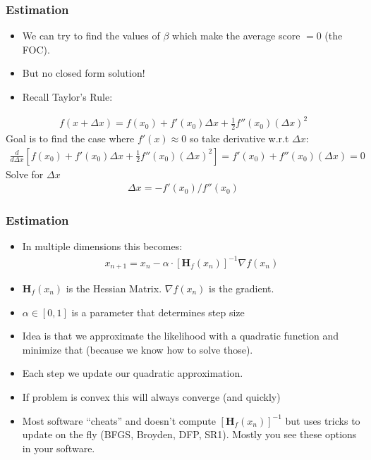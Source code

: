 \documentclass[aspectratio=169]{beamer}
\begin{document}
\begin{frame}
\frametitle{Estimation}
\begin{itemize} 
\item We can try to find the values of $\beta$ which make the average score $=0$ (the FOC).
\item But no closed form solution!
\item Recall Taylor's Rule:
\end{itemize}
\begin{eqnarray*}
f(x + \Delta x) =  f(x_0) + f'(x_0) \Delta x + \frac{1}{2} f''(x_0) (\Delta x)^2
\end{eqnarray*}
Goal is to find the case where $f'(x) \approx 0$ so take derivative w.r.t $\Delta x$:
\begin{eqnarray*}
\frac{d}{d \Delta x} \left[  f(x_0) + f'(x_0) \Delta x + \frac{1}{2} f''(x_0) (\Delta x)^2 \right] = f'(x_0) +  f''(x_0) (\Delta x) = 0
\end{eqnarray*}
Solve for $\Delta x$
\begin{eqnarray*}
\Delta x  = - f'(x_0) / f''(x_0)
\end{eqnarray*}
\end{frame}



\begin{frame}
\frametitle{Estimation}
\begin{itemize} 
\item In multiple dimensions this becomes:
\begin{eqnarray*}
x_{n+1} = x_{n} - \alpha \cdot \left[\mathbf{H}_f (x_n) \right]^{-1} \nabla f(x_n)
\end{eqnarray*}
\item $\mathbf{H}_f (x_n)$ is the \alert{Hessian} Matrix. $ \nabla f(x_n)$ is the \alert{gradient}.
\item $\alpha \in [0,1]$ is a parameter that determines \alert{step size}
\item Idea is that we approximate the likelihood with a quadratic function and minimize that (because we know how to solve those).
\item Each step we update our quadratic approximation.
\item If problem is \alert{convex} this will always converge (and quickly)
\item Most software ``cheats'' and doesn't compute $\left[\mathbf{H}_f (x_n) \right]^{-1}$ but uses tricks to update on the fly (BFGS, Broyden, DFP, SR1). Mostly you see these options in your software.
\end{itemize}
\end{frame}
\end{document}
